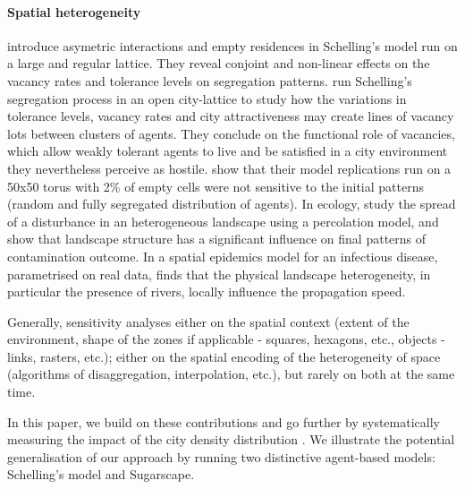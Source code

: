 \documentclass[3p,times,procedia]{elsarticle}
\begin{document}

\paragraph{Spatial heterogeneity} \citet{StaufferSolomon2007} introduce asymetric interactions and empty residences in Schelling's model run on a large and regular lattice. They reveal conjoint and non-linear effects on the vacancy rates and tolerance levels on segregation patterns. \citet{Gauvinetal2010} run Schelling's segregation process in an open city-lattice to study how the variations in tolerance levels, vacancy rates and city attractiveness may create lines of vacancy lots between clusters of agents. They conclude on the functional role of vacancies, which allow weakly tolerant agents to live and be satisfied in a city environment they nevertheless perceive as hostile. \citet{HatnaBenenson2012} show that their model replications run on a 50x50 torus with 2\% of empty cells were not sensitive to the initial patterns (random and fully segregated distribution of agents). In ecology, \citet{smith2002predicting} study the spread of a disturbance in an heterogeneous landscape using a percolation model, and show that landscape structure has a significant influence on final patterns of contamination outcome. In a spatial epidemics model for an infectious disease, parametrised on real data, \citet{smith2002predicting} finds that the physical landscape heterogeneity, in particular the presence of rivers, locally influence the propagation speed.


 Generally, sensitivity analyses  either on the spatial context (extent of the environment, shape of the zones if applicable - squares, hexagons, etc., objects - links, rasters, etc.); either on the spatial encoding of the heterogeneity of space (algorithms of disaggregation, interpolation, etc.), but rarely on both at the same time.


In this paper, we build on these contributions and go further by systematically measuring the impact of the city density distribution . We illustrate the potential generalisation of our approach by running two distinctive agent-based models: Schelling's model and Sugarscape.
\end{document}
